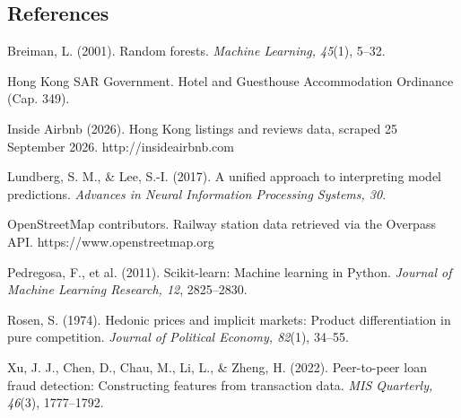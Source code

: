 \documentclass[10pt,a4paper]{article}
\begin{document}
\subsection*{References}
{\fontsize{8.5}{10.2}\selectfont \raggedright Breiman, L. (2001). Random forests. \textit{Machine Learning, 45}(1), 5--32.\par}\vspace{-3.5pt}
{\fontsize{8.5}{10.2}\selectfont \raggedright Hong Kong SAR Government. Hotel and Guesthouse Accommodation Ordinance (Cap. 349).\par}\vspace{-3.5pt}
{\fontsize{8.5}{10.2}\selectfont \raggedright Inside Airbnb (2026). Hong Kong listings and reviews data, scraped 25 September 2026. http://insideairbnb.com\par}\vspace{-3.5pt}
{\fontsize{8.5}{10.2}\selectfont \raggedright Lundberg, S. M., \& Lee, S.-I. (2017). A unified approach to interpreting model predictions. \textit{Advances in Neural Information Processing Systems, 30}.\par}\vspace{-3.5pt}
{\fontsize{8.5}{10.2}\selectfont \raggedright OpenStreetMap contributors. Railway station data retrieved via the Overpass API. https://www.openstreetmap.org\par}\vspace{-3.5pt}
{\fontsize{8.5}{10.2}\selectfont \raggedright Pedregosa, F., et al. (2011). Scikit-learn: Machine learning in Python. \textit{Journal of Machine Learning Research, 12}, 2825--2830.\par}\vspace{-3.5pt}
{\fontsize{8.5}{10.2}\selectfont \raggedright Rosen, S. (1974). Hedonic prices and implicit markets: Product differentiation in pure competition. \textit{Journal of Political Economy, 82}(1), 34--55.\par}\vspace{-3.5pt}
{\fontsize{8.5}{10.2}\selectfont \raggedright Xu, J. J., Chen, D., Chau, M., Li, L., \& Zheng, H. (2022). Peer-to-peer loan fraud detection: Constructing features from transaction data. \textit{MIS Quarterly, 46}(3), 1777--1792.\par}\vspace{-3.5pt}
\newpage
\end{document}
